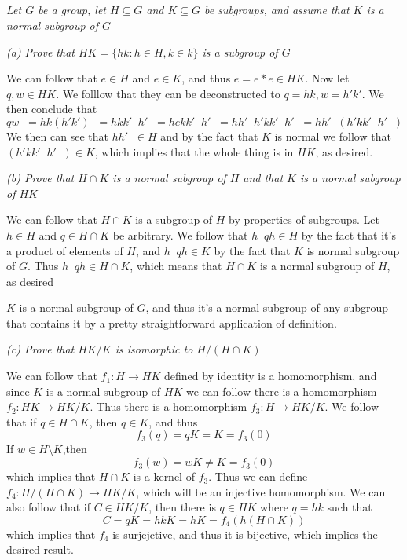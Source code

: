 \documentclass[11pt,oneside,titlepage]{book}
\DeclareMathOperator \inv {^{-1}}
\newcommand{\set}[1]{\{ #1 \}}
\begin{document}
\subsection{}

\textit{Let $G$ be a group, let $H \subseteq G$ and $K \subseteq G$ be
subgroups, and assume that $K$ is a normal subgroup of $G$}

\textit{(a) Prove that $HK = \set{hk: h \in H, k \in k}$ is a subgroup
of $G$}

We can follow that $e \in H$ and $e \in K$, and thus $e = e * e \in
HK$.  Now let $q, w \in HK$. We folllow that they can be deconstructed
to $q = hk, w = h' k'$. We then conclude that
$$q w\inv  = hk (h' k')\inv = h k k' \inv h'\inv = h e k k'\inv h'\inv  =
h h'\inv h' k k'\inv h'\inv = h h'\inv (h' k k'\inv h'\inv)$$ We then
can see that $h h'\inv \in H$ and by the fact that $K$ is normal we
follow that $(h' k k'\inv h'\inv) \in K$, which implies that the whole
thing is in $HK$, as desired.

\textit{(b) Prove that $H \cap K$ is a normal subgroup of $H$ and that
$K$ is a normal subgroup of $HK$}

We can follow that $H \cap K$ is a subgroup of $H$ by properties of
subgroups.  Let $h \in H$ and $q \in H \cap K$ be arbitrary. We follow
that $h\inv q h \in H$ by the fact that it's a product of elements of
$H$, and $h\inv q h \in K$ by the fact that $K$ is normal subgroup of
$G$.  Thus $h\inv q h \in H \cap K$, which means that $H \cap K$ is a
normal subgroup of $H$, as desired

$K$ is a normal subgroup of $G$, and thus it's a normal subgroup of
any subgroup that contains it by a pretty straightforward application
of definition.

\textit{(c) Prove that $HK/K$ is isomorphic to $H/(H \cap K)$}

We can follow that $f_1: H \to HK$ defined by identity is a
homomorphism, and since $K$ is a normal subgroup of $HK$ we can follow
there is a homomorphism $f_2: HK \to HK/K$. Thus there is a
homomorphism $f_3: H \to HK/K$. We follow that if $q \in H \cap K$,
then $q \in K$, and thus
$$f_3(q) = qK = K = f_3(0)$$
If $w \in H \setminus K$,then
$$f_3(w) = wK \neq K = f_3(0)$$
which implies that $H \cap K$ is a kernel of $f_3$. Thus we can define
$f_4: H/(H \cap K) \to HK / K$, which will be an injective
homomorphism.  We can also follow that if $C \in HK/K$, then there is
$q \in HK$ where $q = hk$ such that
$$C = qK = hkK = hK = f_4(h(H \cap K))$$
which implies that $f_4$ is surjejctive, and thus it is bijective,
which implies the desired result.
\end{document}
